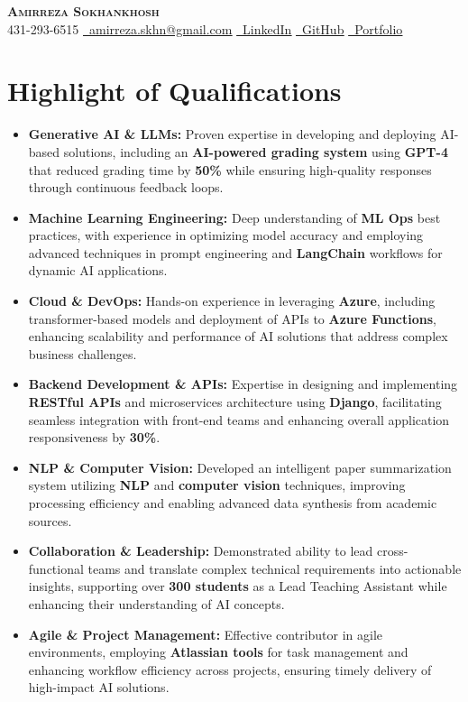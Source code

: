 \documentclass[letterpaper,11pt]{article}
\newcommand{\resumeItem}[1]{
  \item\small{
    #1 \vspace{0pt}
  }
}
\newcommand{\resumeItemListStart}{\begin{itemize}}
\newcommand{\resumeItemListEnd}{\end{itemize}\vspace{-5pt}}
\begin{document}


\begin{center}
    \textbf{\Huge \scshape Amirreza Sokhankhosh} \\ \vspace{1pt}
    \faPhone \small 431-293-6515 \quad
    \href{mailto:amirreza.skhn@gmail.com}{\faEnvelope \ \underline{amirreza.skhn@gmail.com}} \quad
    \href{https://www.linkedin.com/in/amirrezakh/}{\faLinkedin \ \underline{LinkedIn}} \quad
    \href{https://github.com/amirrezaskh}{\faGithub \ \underline{GitHub}} \quad
    \href{https://amirrezaskh.com}{\faBriefcase \ \underline{Portfolio}}
\end{center}

\section{Highlight of Qualifications}
\resumeItemListStart
\resumeItem{\textbf{Generative AI \& LLMs:} Proven expertise in developing and deploying AI-based solutions, including an \textbf{AI-powered grading system} using \textbf{GPT-4} that reduced grading time by \textbf{50\%} while ensuring high-quality responses through continuous feedback loops.}
\resumeItem{\textbf{Machine Learning Engineering:} Deep understanding of \textbf{ML Ops} best practices, with experience in optimizing model accuracy and employing advanced techniques in prompt engineering and \textbf{LangChain} workflows for dynamic AI applications.}
\resumeItem{\textbf{Cloud \& DevOps:} Hands-on experience in leveraging \textbf{Azure}, including transformer-based models and deployment of APIs to \textbf{Azure Functions}, enhancing scalability and performance of AI solutions that address complex business challenges.}
\resumeItem{\textbf{Backend Development \& APIs:} Expertise in designing and implementing \textbf{RESTful APIs} and microservices architecture using \textbf{Django}, facilitating seamless integration with front-end teams and enhancing overall application responsiveness by \textbf{30\%}.}
\resumeItem{\textbf{NLP \& Computer Vision:} Developed an intelligent paper summarization system utilizing \textbf{NLP} and \textbf{computer vision} techniques, improving processing efficiency and enabling advanced data synthesis from academic sources.}
\resumeItem{\textbf{Collaboration \& Leadership:} Demonstrated ability to lead cross-functional teams and translate complex technical requirements into actionable insights, supporting over \textbf{300 students} as a Lead Teaching Assistant while enhancing their understanding of AI concepts.}
\resumeItem{\textbf{Agile \& Project Management:} Effective contributor in agile environments, employing \textbf{Atlassian tools} for task management and enhancing workflow efficiency across projects, ensuring timely delivery of high-impact AI solutions.}
\resumeItemListEnd
\end{document}
